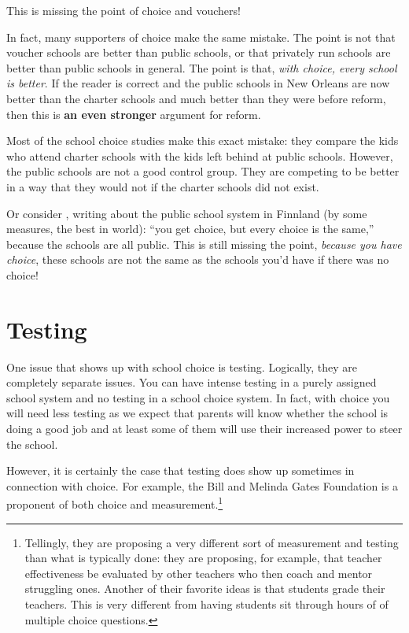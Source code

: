 This is missing the point of choice and vouchers!

In fact, many supporters of choice make the same mistake. The point is not that
voucher schools are better than public schools, or that privately run schools
are better than public schools in general. The point is that, \emph{with
choice, every school is better}. If the reader is correct and the public
schools in New Orleans are now better than the charter schools and much better
than they were before reform, then this is \textbf{an even stronger} argument
for reform.

Most of the school choice studies make this exact mistake: they compare the
kids who attend charter schools with the kids left behind at public schools.
However, the public schools are not a good control group. They are competing to
be better in a way that they would not if the charter schools did not exist.

Or consider \FIXME{}, writing about the public school system in Finnland (by
some measures, the best in world): ``you get choice, but every choice is the
same,'' because the schools are all public.  This is still missing the point,
\emph{because you have choice}, these schools are not the same as the schools
you'd have if there was no choice!

\section{Testing}


One issue that shows up with school choice is testing. Logically, they are
completely separate issues. You can have intense testing in a purely assigned
school system and no testing in a school choice system. In fact, with choice
you will need less testing as we expect that parents will know whether the
school is doing a good job and at least some of them will use their increased
power to steer the school.

However, it is certainly the case that testing does show up sometimes in
connection with choice. For example, the Bill and Melinda Gates Foundation is a
proponent of both choice and measurement.\footnote{Tellingly, they are
proposing a very different sort of measurement and testing than what is
typically done: they are proposing, for example, that teacher effectiveness be
evaluated by other teachers who then coach and mentor struggling ones. Another
of their favorite ideas is that students grade their teachers. This is very
different from having students sit through hours of of multiple choice
questions.}

